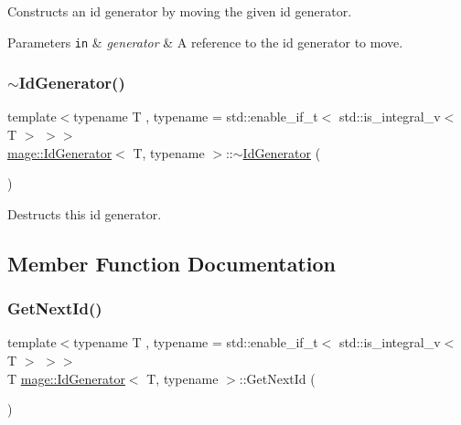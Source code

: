 Constructs an id generator by moving the given id generator.


\begin{DoxyParams}[1]{Parameters}
\mbox{\tt in}  & {\em generator} & A reference to the id generator to move. \\
\hline
\end{DoxyParams}
\mbox{\label{classmage_1_1_id_generator_abdf26785e483c70cc68dc5816d15e2b6}} 
\subsubsection{\texorpdfstring{$\sim$\+Id\+Generator()}{~IdGenerator()}}
{\footnotesize\ttfamily template$<$typename T , typename  = std\+::enable\+\_\+if\+\_\+t$<$ std\+::is\+\_\+integral\+\_\+v$<$ T $>$ $>$$>$ \\
\mbox{\hyperlink{classmage_1_1_id_generator}{mage\+::\+Id\+Generator}}$<$ T, typename $>$\+::$\sim$\mbox{\hyperlink{classmage_1_1_id_generator}{Id\+Generator}} (\begin{DoxyParamCaption}{ }\end{DoxyParamCaption})\hspace{0.3cm}{\ttfamily [default]}}

Destructs this id generator. 

\subsection{Member Function Documentation}
\mbox{\label{classmage_1_1_id_generator_a442beff7c7e810554f6bf5331c0d4fb8}} 
\subsubsection{\texorpdfstring{Get\+Next\+Id()}{GetNextId()}}
{\footnotesize\ttfamily template$<$typename T , typename  = std\+::enable\+\_\+if\+\_\+t$<$ std\+::is\+\_\+integral\+\_\+v$<$ T $>$ $>$$>$ \\
T \mbox{\hyperlink{classmage_1_1_id_generator}{mage\+::\+Id\+Generator}}$<$ T, typename $>$\+::Get\+Next\+Id (\begin{DoxyParamCaption}{ }\end{DoxyParamCaption})\hspace{0.3cm}{\ttfamily [noexcept]}}

